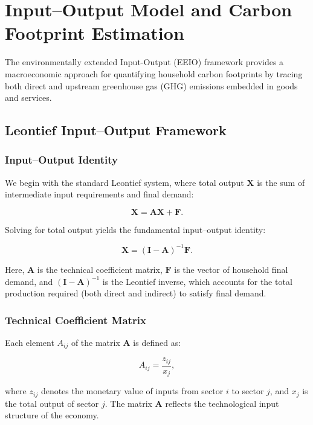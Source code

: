 \documentclass[12pt,a4paper]{article}%
\begin{document}
\section{Input–Output Model and Carbon Footprint Estimation}
The environmentally extended Input-Output (EEIO) framework provides a macroeconomic approach for quantifying household carbon footprints by tracing both direct and upstream greenhouse gas (GHG) emissions embedded in goods and services. 

\subsection{Leontief Input–Output Framework}

\subsubsection{Input–Output Identity}

We begin with the standard Leontief system, where total output \( \mathbf{X} \) is the sum of intermediate input requirements and final demand:

\begin{equation}
\mathbf{X} = \mathbf{A} \mathbf{X} + \mathbf{F}.
\end{equation}

Solving for total output yields the fundamental input–output identity:

\begin{equation}
\mathbf{X} = {(\mathbf{I} - \mathbf{A})}^{-1} \mathbf{F}.
\end{equation}

Here, \( \mathbf{A} \) is the technical coefficient matrix, \( \mathbf{F} \) is the vector of household final demand, and \( {(\mathbf{I} - \mathbf{A})}^{-1} \) is the Leontief inverse, which accounts for the total production required (both direct and indirect) to satisfy final demand.

\subsubsection{Technical Coefficient Matrix}

Each element \( A_{ij} \) of the matrix \( \mathbf{A} \) is defined as:

\begin{equation}
A_{ij} = \frac{z_{ij}}{x_j},
\end{equation}

where \( z_{ij} \) denotes the monetary value of inputs from sector \( i \) to sector \( j \), and \( x_j \) is the total output of sector \( j \). The matrix \( \mathbf{A} \) reflects the technological input structure of the economy.
\end{document}
